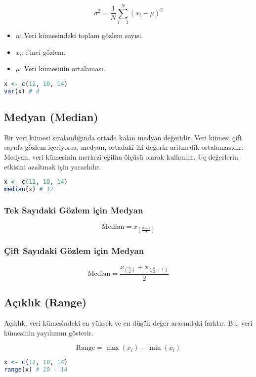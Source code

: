\[
\sigma^2 = \frac{1}{N} \sum_{i=1}^{N} (x_i - \mu)^2
\]

\begin{itemize}
    \item $n$: Veri kümesindeki toplam gözlem sayısı.
    \item $x_i$: i'inci gözlem.
    \item $\mu$: Veri kümesinin ortalaması. 
\end{itemize}

\begin{lstlisting}[language=R]
x <- c(12, 10, 14)
var(x) # 4
\end{lstlisting}

\subsection{Medyan (Median)}
Bir veri kümesi sıralandığında ortada kalan medyan değeridir. Veri kümesi çift sayıda gözlem içeriyorsa, medyan, ortadaki iki değerin aritmedik ortalamasıdır. Medyan, veri kümesinin merkezi eğilim ölçüsü olarak kullanılır. Uç değerlerin etkisini azaltmak için yararlıdır.

\begin{lstlisting}[language=R]
x <- c(12, 10, 14)
median(x) # 12
\end{lstlisting}

\subsubsection{Tek Sayıdaki Gözlem için Medyan}

\[
\text{Median} = x_{\left(\frac{n+1}{2}\right)}
\]

\subsubsection{Çift Sayıdaki Gözlem için Medyan}

\[
\text{Median} = \frac{x_{\left(\frac{n}{2}\right)} + x_{\left(\frac{n}{2}+1\right)}}{2}
\]

\subsection{Açıklık (Range)}
Açıklık, veri kümesindeki en yüksek ve en düşük değer arasındaki farktır. Bu, veri kümesinin yayılımını gösterir.

\[
\text{Range} = \max(x_i) - \min(x_i)
\]

\begin{lstlisting}[language=R]
x <- c(12, 10, 14)
range(x) # 10 - 14
\end{lstlisting}

